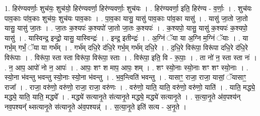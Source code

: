 \documentclass[17pt]{extarticle}
\begin{document}
1. हिर॑ण्यवर्णाः॒ शुच॑यः॒ शुच॑यो॒ हिर॑ण्यवर्णा॒ हिर॑ण्यवर्णाः॒ शुच॑यः । . हिर॑ण्यवर्णा॒ इति॒ हिर॑ण्य - व॒र्णाः॒ । . शुच॑यः पाव॒काः पा॑व॒काः शुच॑यः॒ शुच॑यः पाव॒काः । . पा॒व॒का यासु॒ यासु॑ पाव॒काः पा॑व॒का यासु॑ । . यासु॑ जा॒तो जा॒तो यासु॒ यासु॑ जा॒तः । . जा॒तः क॒श्यपः॑ क॒श्यपो॑ जा॒तो जा॒तः क॒श्यपः॑ । . क॒श्यपो॒ यासु॒ यासु॑ क॒श्यपः॑ क॒श्यपो॒ यासु॑ । . यास्विन्द्र॒ इन्द्रो॒ यासु॒ यास्विन्द्रः॑ । . इन्द्र॒ इतीन्द्रः॑ । . अ॒ग्निं ॅया या अ॒ग्नि म॒ग्निं ॅयाः । . या गर्भ॒म् गर्भं॒ ॅया या गर्भ᳚म् । . गर्भ॑म् दधि॒रे द॑धि॒रे गर्भ॒म् गर्भ॑म् दधि॒रे । . द॒धि॒रे विरू॑पा॒ विरू॑पा दधि॒रे द॑धि॒रे विरू॑पाः । . विरू॑पा॒ स्ता स्ता विरू॑पा॒ विरू॑पा॒ स्ताः । . विरू॑पा॒ इति॒ वि - रू॒पाः॒ । . ता नो॑ न॒ स्ता स्ता नः॑ । . न॒ आप॒ आपो॑ नो न॒ आपः॑ । . आपः॒ शꣳ श माप॒ आपः॒ शम् । . शꣳ स्यो॒नाः स्यो॒नाः शꣳ शꣳ स्यो॒नाः । . स्यो॒ना भ॑वन्तु भवन्तु स्यो॒नाः स्यो॒ना भ॑वन्तु । . भ॒व॒न्त्विति॑ भवन्तु । . यासाꣳ॒॒ राजा॒ राजा॒ यासां॒ ॅयासाꣳ॒॒ राजा᳚ । . राजा॒ वरु॑णो॒ वरु॑णो॒ राजा॒ राजा॒ वरु॑णः । . वरु॑णो॒ याति॒ याति॒ वरु॑णो॒ वरु॑णो॒ याति॑ । . याति॒ मद्ध्ये॒ मद्ध्ये॒ याति॒ याति॒ मद्ध्ये᳚ । . मद्ध्ये॑ सत्यानृ॒ते स॑त्यानृ॒ते मद्ध्ये॒ मद्ध्ये॑ सत्यानृ॒ते । . स॒त्या॒नृ॒ते अ॑व॒पश्य॑न् नव॒पश्यन्᳚ थ्सत्यानृ॒ते स॑त्यानृ॒ते अ॑व॒पश्यन्न्॑ । . स॒त्या॒नृ॒ते इति॑ सत्य - अ॒नृ॒ते । \newline
\end{document}
